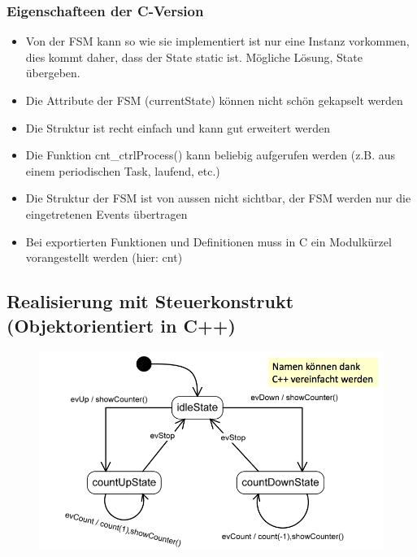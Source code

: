 \subsubsection{Eigenschafteen der C-Version}
\begin{itemize}
      \item Von der FSM kann so wie sie implementiert ist nur eine Instanz vorkommen, dies kommt daher, dass der State static ist. Mögliche Lösung, State übergeben.
      \item Die Attribute der FSM (currentState) können nicht schön gekapselt werden
      \item Die Struktur ist recht einfach und kann gut erweitert werden
      \item Die Funktion cnt\_ctrlProcess() kann beliebig aufgerufen werden (z.B. aus einem periodischen Task, laufend, etc.)
      \item Die Struktur der FSM ist von aussen nicht sichtbar, der FSM werden nur die eingetretenen Events übertragen
      \item Bei exportierten Funktionen und Definitionen muss in C ein Modulkürzel vorangestellt werden (hier: cnt)
\end{itemize}


\subsection{Realisierung mit Steuerkonstrukt (Objektorientiert in
      C++)}

\begin{figure}[H]
      \centering
      \includegraphics[scale = 0.35]{images/FSM/Up_down_counter_obj}
\end{figure}

